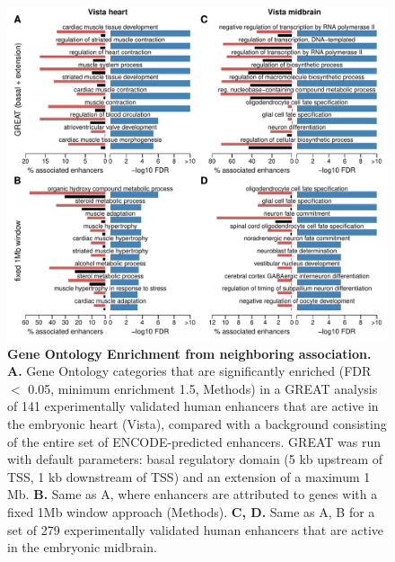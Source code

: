 \begin{figure}[hbt!]
 \centering
 \includegraphics[width=1\textwidth, page=1] {figures/GOntact/Figure2.pdf}
 \caption[Gene Ontology Enrichment from neighboring association.]{
 \textbf{Gene Ontology Enrichment from neighboring association.}
 \textbf{A.} Gene Ontology categories that are significantly enriched (FDR $<$ 0.05, minimum enrichment 1.5, Methods) in a GREAT analysis of 141 experimentally validated human enhancers that are active in the embryonic heart (Vista), compared with a background consisting of the entire set of ENCODE-predicted enhancers. GREAT was run with default parameters: basal regulatory domain (5 kb upstream of TSS, 1 kb downstream of TSS) and an extension of a maximum 1 Mb. 
 \textbf{B.} Same as A, where enhancers are attributed to genes with a fixed 1Mb window approach (Methods). 
 \textbf{C, D.} Same as A, B for a set of 279 experimentally validated human enhancers that are active in the embryonic midbrain. 
 \\
 }
 \label{fig:GOntact-fig2}
\end{figure} 

